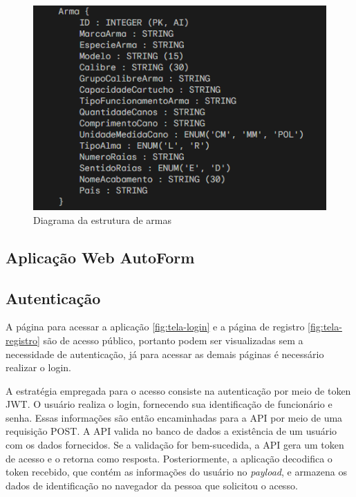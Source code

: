 \begin{figure}[H]
    \caption{\label{fig:diagrama-armas}Diagrama da estrutura de armas}
    \begin{center}
        \includegraphics[scale=0.82]{imagens/diagramaArma.png}
    \end{center}
\end{figure}






\subsection{Aplicação Web AutoForm}

\subsection{Autenticação}

A página para acessar a aplicação \autoref{fig:tela-login} e a página de registro \autoref{fig:tela-registro} são de acesso público, portanto podem ser visualizadas sem a necessidade de autenticação, já para acessar as demais páginas é necessário realizar o login.

A estratégia empregada para o acesso consiste na autenticação por meio de token JWT. O usuário realiza o login, fornecendo sua identificação de funcionário e senha. Essas informações são então encaminhadas para a API por meio de uma requisição POST. 
A API valida no banco de dados a existência de um usuário com os dados fornecidos. 
Se a validação for bem-sucedida, a API gera um token de acesso e o retorna como resposta. Posteriormente, a aplicação decodifica o token recebido, que contém as informações do usuário no \textit{payload}, e armazena os dados de identificação no navegador da pessoa que solicitou o acesso.

